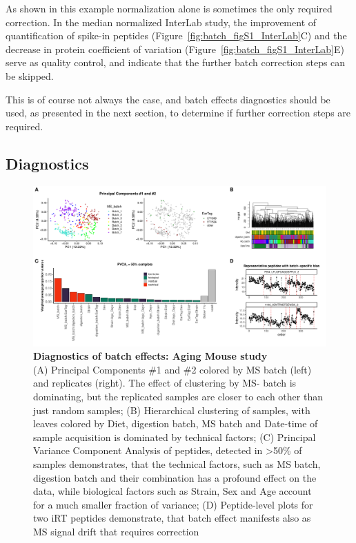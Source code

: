 \documentclass[num-refs]{wiley-article}
\begin{document}
As shown in this example normalization alone is sometimes the only required correction. In the median normalized InterLab study, the improvement of quantification of spike-in peptides (Figure~\ref{fig:batch_figS1_InterLab}C) and the decrease in protein coefficient of variation (Figure~\ref{fig:batch_figS1_InterLab}E) serve as quality control, and indicate that the further batch correction steps can be skipped.

This is of course not always the case, and batch effects diagnostics should be used, as presented in the next section, to determine if further correction steps are required.


\subsection{Diagnostics}

\begin{figure}[hbt]
	\includegraphics[width=\textwidth]{figures/Fig3_diagnostics.pdf}
	\caption{\textbf{Diagnostics of batch effects: Aging Mouse study}  \\
		\footnotesize
		(A) Principal Components \#1 and \#2 colored by MS batch (left) and replicates (right). The effect of clustering by MS- batch is dominating, but the replicated samples are closer to each other than just random samples; (B) Hierarchical clustering of samples, with leaves colored by Diet, digestion batch, MS batch and Date-time of sample acquisition is dominated by technical factors; (C) Principal Variance Component Analysis of peptides, detected in >50\% of samples demonstrates, that the technical factors, such as MS batch, digestion batch and their combination has a profound effect on the data, while biological factors such as Strain, Sex and Age account for a much smaller fraction of variance; (D) Peptide-level plots for two iRT peptides demonstrate, that batch effect manifests also as MS signal drift that requires correction}
	\label{fig:batch_fig3_diagnostics}
\end{figure}
\end{document}
